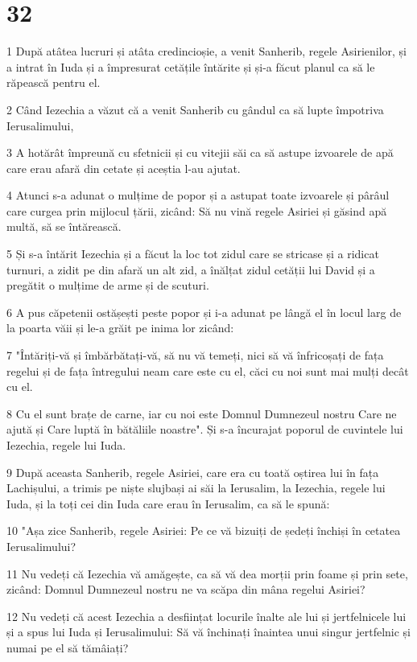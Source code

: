\chapter{32}

\par 1 După atâtea lucruri și atâta credincioșie, a venit Sanherib, regele Asirienilor, și a intrat în Iuda și a împresurat cetățile întărite și și-a făcut planul ca să le răpească pentru el.
\par 2 Când Iezechia a văzut că a venit Sanherib cu gândul ca să lupte împotriva Ierusalimului,
\par 3 A hotărât împreună cu sfetnicii și cu vitejii săi ca să astupe izvoarele de apă care erau afară din cetate și aceștia l-au ajutat.
\par 4 Atunci s-a adunat o mulțime de popor și a astupat toate izvoarele și pârâul care curgea prin mijlocul țării, zicând: Să nu vină regele Asiriei și găsind apă multă, să se întărească.
\par 5 Și s-a întărit Iezechia și a făcut la loc tot zidul care se stricase și a ridicat turnuri, a zidit pe din afară un alt zid, a înălțat zidul cetății lui David și a pregătit o mulțime de arme și de scuturi.
\par 6 A pus căpetenii ostășești peste popor și i-a adunat pe lângă el în locul larg de la poarta văii și le-a grăit pe inima lor zicând:
\par 7 "Întăriți-vă și îmbărbătați-vă, să nu vă temeți, nici să vă înfricoșați de fața regelui și de fața întregului neam care este cu el, căci cu noi sunt mai mulți decât cu el.
\par 8 Cu el sunt brațe de carne, iar cu noi este Domnul Dumnezeul nostru Care ne ajută și Care luptă în bătăliile noastre". Și s-a încurajat poporul de cuvintele lui Iezechia, regele lui Iuda.
\par 9 După aceasta Sanherib, regele Asiriei, care era cu toată oștirea lui în fața Lachișului, a trimis pe niște slujbași ai săi la Ierusalim, la Iezechia, regele lui Iuda, și la toți cei din Iuda care erau în Ierusalim, ca să le spună:
\par 10 "Așa zice Sanherib, regele Asiriei: Pe ce vă bizuiți de ședeți închiși în cetatea Ierusalimului?
\par 11 Nu vedeți că Iezechia vă amăgește, ca să vă dea morții prin foame și prin sete, zicând: Domnul Dumnezeul nostru ne va scăpa din mâna regelui Asiriei?
\par 12 Nu vedeți că acest Iezechia a desființat locurile înalte ale lui și jertfelnicele lui și a spus lui Iuda și Ierusalimului: Să vă închinați înaintea unui singur jertfelnic și numai pe el să tămâiați?
